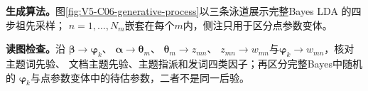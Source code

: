 \documentclass[UTF8,a4paper,11pt,openany]{ctexbook}
\begin{document}
\setcounter{page}{681}
\setcounter{chapter}{35}
\setcounter{section}{1}
\setcounter{figure}{2}
\pagestyle{headings}
\textbf{生成算法。}图\ref{fig:V5-C06-generative-process}以三条泳道展示完整Bayes LDA 的四步祖先采样；
$n=1,\ldots,N_m$嵌套在每个$m$内，侧注只用于区分点参数变体。

\FloatBarrier
\noindent\textbf{读图检查。}沿
$\boldsymbol\beta\to\boldsymbol\varphi_k$、
$\boldsymbol\alpha\to\boldsymbol\theta_m$、
$\boldsymbol\theta_m\to z_{mn}$、
$z_{mn}\to w_{mn}$与$\boldsymbol\varphi_k\to w_{mn}$，核对主题词先验、
文档主题先验、主题指派和发词四类因子；再区分完整Bayes中随机的
$\boldsymbol\varphi_k$与点参数变体中的待估参数，二者不是同一后验。
\end{document}
